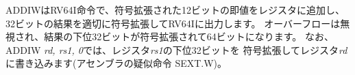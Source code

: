 \newpage
\begin{comment}
\subsubsection*{Integer Register-Immediate Instructions}
\end{commenT}
\subsubsection*{整数レジスタ-即値命令}
\vspace{-0.4in}
\begin{center}
\begin{tabular}{M@{}R@{}S@{}R@{}O}
\\
\instbitrange{31}{20} &
\instbitrange{19}{15} &
\instbitrange{14}{12} &
\instbitrange{11}{7} &
\instbitrange{6}{0} \\
\hline
\multicolumn{1}{|c|}{imm[11:0]} &
\multicolumn{1}{c|}{rs1} &
\multicolumn{1}{c|}{funct3} &
\multicolumn{1}{c|}{rd} &
\multicolumn{1}{c|}{opcode} \\
\hline
12 & 5 & 3 & 5 & 7 \\
I-immediate[11:0] & src & ADDIW  & dest & OP-IMM-32 \\
\end{tabular}
\end{center}

\begin{comment}
ADDIW is an RV64I instruction that adds the sign-extended 12-bit
immediate to register {\em rs1} and produces the proper sign-extension
of a 32-bit result in {\em rd}.  Overflows are ignored and the result
is the low 32 bits of the result sign-extended to 64 bits.  Note,
ADDIW {\em rd, rs1, 0} writes the sign-extension of the lower 32 bits
of register {\em rs1} into register {\em rd} (assembler pseudoinstruction
SEXT.W).
\end{comment}

ADDIWはRV64I命令で、符号拡張された12ビットの即値をレジスタに追加し、
32ビットの結果を適切に符号拡張してRV64Iに出力します。
オーバーフローは無視され、結果の下位32ビットが符号拡張されて64ビットになります。
なお、ADDIW {\em rd, rs1, 0}では、レジスタ{\em rs1}の下位32ビットを
符号拡張してレジスタ{\em rd}に書き込みます(アセンブラの疑似命令 SEXT.W)。

